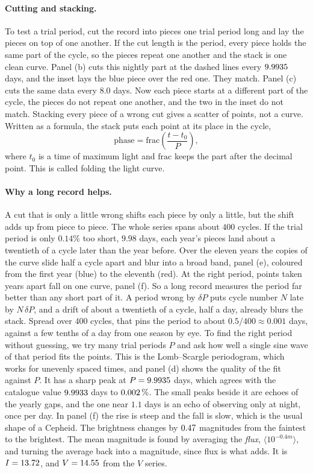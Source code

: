 \paragraph{Cutting and stacking.} To test a trial period, cut the record into pieces one trial period long and lay the pieces on top of one another. If the cut length is the period, every piece holds the same part of the cycle, so the pieces repeat one another and the stack is one clean curve. Panel (b) cuts this nightly part at the dashed lines every $9.9935$ days, and the inset lays the blue piece over the red one. They match. Panel (c) cuts the same data every $8.0$ days. Now each piece starts at a different part of the cycle, the pieces do not repeat one another, and the two in the inset do not match. Stacking every piece of a wrong cut gives a scatter of points, not a curve. Written as a formula, the stack puts each point at its place in the cycle,
\begin{equation}
	\text{phase}=\mathrm{frac}\!\left(\frac{t-t_0}{P}\right),
	\label{as:eq:fold}
\end{equation}
where $t_0$ is a time of maximum light and $\mathrm{frac}$ keeps the part after the decimal point. This is called folding the light curve.

\paragraph{Why a long record helps.} A cut that is only a little wrong shifts each piece by only a little, but the shift adds up from piece to piece. The whole series spans about $400$ cycles. If the trial period is only $0.14\%$ too short, $9.98$ days, each year's pieces land about a twentieth of a cycle later than the year before. Over the eleven years the copies of the curve slide half a cycle apart and blur into a broad band, panel (e), coloured from the first year (blue) to the eleventh (red). At the right period, points taken years apart fall on one curve, panel (f). So a long record measures the period far better than any short part of it. A period wrong by $\delta P$ puts cycle number $N$ late by $N\,\delta P$, and a drift of about a twentieth of a cycle, half a day, already blurs the stack. Spread over $400$ cycles, that pins the period to about $0.5/400\approx0.001$ days, against a few tenths of a day from one season by eye. To find the right period without guessing, we try many trial periods $P$ and ask how well a single sine wave of that period fits the points. This is the Lomb--Scargle periodogram, which works for unevenly spaced times, and panel (d) shows the quality of the fit against $P$. It has a sharp peak at $P=9.9935$ days, which agrees with the catalogue value $9.9933$ days to $0.002\,\%$. The small peaks beside it are echoes of the yearly gaps, and the one near $1.1$ days is an echo of observing only at night, once per day. In panel (f) the rise is steep and the fall is slow, which is the usual shape of a Cepheid. The brightness changes by $0.47$ magnitudes from the faintest to the brightest. The mean magnitude is found by averaging the \emph{flux}, $\langle10^{-0.4m}\rangle$, and turning the average back into a magnitude, since flux is what adds. It is $I=13.72$, and $V=14.55$ from the $V$ series.

